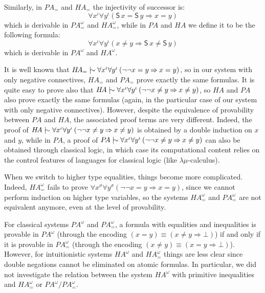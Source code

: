 \documentclass{CSML}
\newcommand*\Derives{\mathrel{|\mkern-8.75mu\sim}}
\newcommand*\SortA{\sigma}
\newcommand*\LogSortedTerm[2]{#1^{#2}}
\newcommand*\LogVarA{x}
\newcommand*\LogVarB{y}
\newcommand*\LogConst[1]{\mathsf{#1}}
\newcommand*\LogImp{\mathbin{\Rightarrow}}
\newcommand*\LogBot\bot
\newcommand*\HA{{H\!A}}
\newcommand*\PA{{P\!A}}
\newcommand*\CASort\iota
\newcommand*\CALogS{\LogConst{S}}
\begin{document}
Similarly, in $\PA_=$ and $\HA_=$ the injectivity of successor is:
$$\forall\LogSortedTerm{\LogVarA}{\CASort}\forall\LogSortedTerm{\LogVarB}{\CASort}\left(\CALogS\,\LogVarA=\CALogS\,\LogVarB\LogImp\LogVarA=\LogVarB\right)$$
which is derivable in $\PA^\omega_=$ and $\HA^\omega_=$, while in $\PA$ and $\HA$ we define it to be the following formula:
$$\forall\LogSortedTerm{\LogVarA}{\CASort}\forall\LogSortedTerm{\LogVarB}{\CASort}\left(\LogVarA\neq\LogVarB\LogImp\CALogS\,\LogVarA\neq\CALogS\,\LogVarB\right)$$
which is derivable in $\PA^\omega$ and $HA^\omega$.\par
It is well known that $\HA_=\Derives\forall\LogSortedTerm{\LogVarA}{\CASort}\forall\LogSortedTerm{\LogVarB}{\CASort}\left(\neg\neg\LogVarA=\LogVarB\LogImp\LogVarA=\LogVarB\right)$, so in our system with only negative connectives, $\HA_=$ and $\PA_=$ prove exactly the same formulas. It is quite easy to prove also that $\HA\Derives\forall\LogSortedTerm{\LogVarA}{\CASort}\forall\LogSortedTerm{\LogVarB}{\CASort}\left(\neg\neg\LogVarA\neq\LogVarB\LogImp\LogVarA\neq\LogVarB\right)$, so $\HA$ and $\PA$ also prove exactly the same formulas (again, in the particular case of our system with only negative connectives). However, despite the equivalence of provability between $\PA$ and $\HA$, the associated proof terms are very different. Indeed, the proof of $\HA\Derives\forall\LogSortedTerm{\LogVarA}{\CASort}\forall\LogSortedTerm{\LogVarB}{\CASort}\left(\neg\neg\LogVarA\neq\LogVarB\LogImp\LogVarA\neq\LogVarB\right)$ is obtained by a double induction on $\LogVarA$ and $\LogVarB$, while in $\PA$, a proof of $\PA\Derives\forall\LogSortedTerm{\LogVarA}{\CASort}\forall\LogSortedTerm{\LogVarB}{\CASort}\left(\neg\neg\LogVarA\neq\LogVarB\LogImp\LogVarA\neq\LogVarB\right)$ can also be obtained through classical logic, in which case its computational content relies on the control features of languages for classical logic (like $\lambda\mu$-calculus).\par
When we switch to higher type equalities, things become more complicated. Indeed, $\HA^\omega_=$ fails to prove $\forall\LogSortedTerm{\LogVarA}{\SortA}\forall\LogSortedTerm{\LogVarB}{\SortA}\left(\neg\neg\LogVarA=\LogVarB\LogImp\LogVarA=\LogVarB\right)$, since we cannot perform induction on higher type variables, so the systems $\HA^\omega_=$ and $\PA^\omega_=$ are not equivalent anymore, even at the level of provability.\par
For classical systems $\PA^\omega$ and $\PA^\omega_=$, a formula with equalities and inequalities is provable in $\PA^\omega$ (through the encoding $\left(\LogVarA=\LogVarB\right)\equiv\left(\LogVarA\neq\LogVarB\LogImp\LogBot\right)$) if and only if it is provable in $\PA^\omega_=$ (through the encoding $\left(\LogVarA\neq\LogVarB\right)\equiv\left(\LogVarA=\LogVarB\LogImp\LogBot\right)$). However, for intuitionistic systems $\HA^\omega$ and $\HA^\omega_=$ things are less clear since double negations cannot be eliminated on atomic formulas. In particular, we did not investigate the relation between the system $\HA^\omega$ with primitive inequalities and $\HA^\omega_=$ or $\PA^\omega/\PA^\omega_=$.
\end{document}
